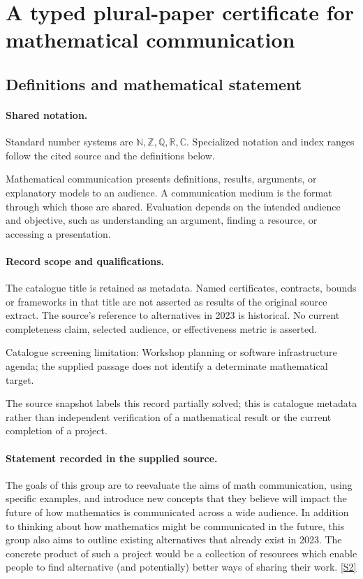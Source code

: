\documentclass[11pt]{article}
\newcommand{\sref}[2]{\hyperlink{source:#1:#2}{[S#2]}}
\begin{document}
\section{A typed plural-paper certificate for mathematical communication}\label{statement}

\subsection{Definitions and mathematical statement}

\paragraph{Shared notation.}Standard number systems are $\mathbb N,\mathbb Z,\mathbb Q,\mathbb R,\mathbb C$. Specialized notation and index ranges follow the cited source and the definitions below.


Mathematical communication presents definitions, results, arguments, or explanatory models to an audience. A communication medium is the format through which those are shared. Evaluation depends on the intended audience and objective, such as understanding an argument, finding a resource, or accessing a presentation.
\paragraph{Record scope and qualifications.}
The catalogue title is retained as metadata. Named certificates, contracts, bounds or frameworks in that title are not asserted as results of the original source extract.
The source's reference to alternatives in 2023 is historical. No current completeness claim, selected audience, or effectiveness metric is asserted.

Catalogue screening limitation: Workshop planning or software infrastructure agenda; the supplied passage does not identify a determinate mathematical target.

The source snapshot labels this record partially solved; this is catalogue metadata rather than independent verification of a mathematical result or the current completion of a project.
\paragraph{Statement recorded in the supplied source.}
The goals of this group are to reevaluate the aims of math communication, using specific examples, and introduce new concepts that they believe will impact the future of how mathematics is communicated across a wide audience.
In addition to thinking about how mathematics might be communicated in the future, this group also aims to outline existing alternatives that already exist in 2023. The concrete product of such a project would be a collection of resources which enable people to find alternative (and potentially) better ways of sharing their work. \sref{statement}{2}
\end{document}
